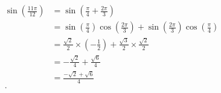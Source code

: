 \begin{solution}
\begin{itemize}
      \begin{align*}
        \sin \left(\frac{11\pi}{12}\right) &= \sin \left(\frac{\pi}{4} + \frac{2\pi}{3}\right) \\
                                           &= \sin \left(\frac{\pi}{4}\right)\cos \left(\frac{2\pi}{3}\right) + \sin \left(\frac{2\pi}{3}\right)\cos \left(\frac{\pi}{4}\right) \\
                                           &= \frac{\sqrt{2}}{2} \times \left(-\frac{1}{2}\right) + \frac{\sqrt{3}}{2} \times \frac{\sqrt{2}}{2} \\
                                           &= -\frac{\sqrt{2}}{4} + \frac{\sqrt{6}}{4} \\
                                           &= \frac{-\sqrt{2} + \sqrt{6}}{4} \\
      .\end{align*}
  \end{itemize}
\end{solution}

